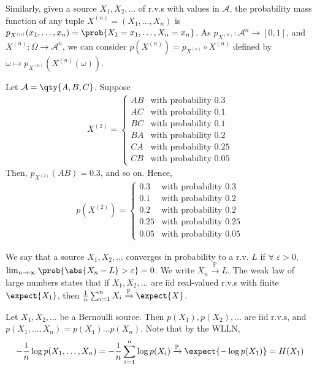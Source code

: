 Similarly, given a source $X_1, X_2, \dots$ of r.v.s with values in $\mathcal A$, the probability mass function of any tuple $X^{(n)} = (X_1, \dots, X_n)$ is $p_{X^{(n)}}(x_1, \dots, x_n) = \prob{X_1 = x_1, \dots, X_n = x_n}$.
As $p_{X^{(n)}} \colon \mathcal A^n \to [0,1]$, and $X^{(n)} \colon \Omega \to \mathcal A^n$, we can consider $p(X^{(n)}) = p_{X^{(n)}} \circ X^{(n)}$ defined by $\omega \mapsto p_{X^{(n)}}(X^{(n)}(\omega))$.

\begin{example}
    Let $\mathcal A = \qty{A, B, C}$.
    Suppose
    \begin{align*}
        X^{(2)} = \begin{cases}
        AB & \text{with probability } 0.3 \\
        AC & \text{with probability } 0.1 \\
        BC & \text{with probability } 0.1 \\
        BA & \text{with probability } 0.2 \\
        CA & \text{with probability } 0.25 \\
        CB & \text{with probability } 0.05
    \end{cases}
    \end{align*}
    Then, $p_{X^{(2)}}(AB) = 0.3$, and so on.
    Hence,
    \begin{align*}
        p(X^{(2)}) = \begin{cases}
        0.3 & \text{with probability } 0.3 \\
        0.1 & \text{with probability } 0.2 \\
        0.2 & \text{with probability } 0.2 \\
        0.25 & \text{with probability } 0.25 \\
        0.05 & \text{with probability } 0.05
    \end{cases}
    \end{align*}
\end{example}

We say that a source $X_1,X_2, \dots$ converges in probability to a r.v. $L$ if $\forall \; \varepsilon > 0$, $\lim_{n \to \infty} \prob{\abs{X_n - L} > \varepsilon} = 0$.
We write $X_n \xrightarrow{\mathbb P} L$.
The weak law of large numbers states that if $X_1, X_2, \dots$ are iid real-valued r.v.s with finite $\expect{X_1}$, then $\frac{1}{n} \sum_{i=1}^n X_i \xrightarrow{\mathbb P} \expect{X}$.

\begin{example}[Bernoulli] \label{exm:ber}
    Let $X_1, X_2, \dots$ be a Bernoulli source.
    Then $p(X_1), p(X_2), \dots$ are iid r.v.s, and $p(X_1, \dots, X_n) = p(X_1) \dots p(X_n)$.
    Note that by the WLLN,
    \begin{align*}
        -\frac{1}{n} \log p(X_1, \dots, X_n) = -\frac{1}{n} \sum_{i=1}^n \log p(X_i) \xrightarrow{\mathbb P} \expect{-\log p(X_1)} = H(X_1)
    \end{align*}
\end{example}

